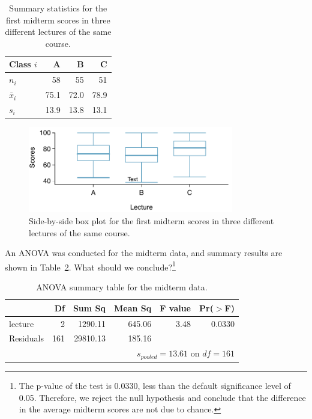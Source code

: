 \begin{table}
\centering
\begin{tabular}{lrrr}
  \hline
Class $i$	& A	& B	& C \\
  \hline
$n_i$		& 58	& 55	& 51 \\
$\bar{x}_i$	& 75.1	& 72.0	& 78.9 \\
$s_i$		& 13.9	& 13.8	& 13.1 \\
\hline
\end{tabular}
\caption{Summary statistics for the first midterm scores in three different lectures of the same course.}
\label{summaryStatisticsForClassTestData}
\end{table}

\begin{figure}
\centering
\includegraphics[width=0.8\textwidth]{ch_inference_for_means/figures/classData/classDataSBSBoxPlot}
\caption{Side-by-side box plot for the first midterm scores in three different  lectures of the same course.}
\label{classDataSBSBoxPlot}
\end{figure}

\begin{exercise} \label{exerExaminingAnovaSummaryTableForMidtermData}
An ANOVA was conducted for the midterm data, and summary results are shown in Table~\ref{anovaSummaryTableForMidtermData}. What should we conclude?\footnote{The p-value of the test is 0.0330, less than the default significance level of 0.05. Therefore, we reject the null hypothesis and conclude that the difference in the average midterm scores are not due to chance.}
\end{exercise}

\begin{table}
\centering
\begin{tabular}{lrrrrr}
  \hline
 & Df & Sum Sq & Mean Sq & F value & Pr($>$F) \\
  \hline
lecture & 2 & 1290.11 & 645.06 & 3.48 & 0.0330 \\
  Residuals & 161 & 29810.13 & 185.16 &  &  \\
   \hline
\multicolumn{6}{r}{$s_{pooled}=13.61$ on $df=161$}
\end{tabular}
\caption{ANOVA summary table for the midterm data.}
\label{anovaSummaryTableForMidtermData}
\end{table}

